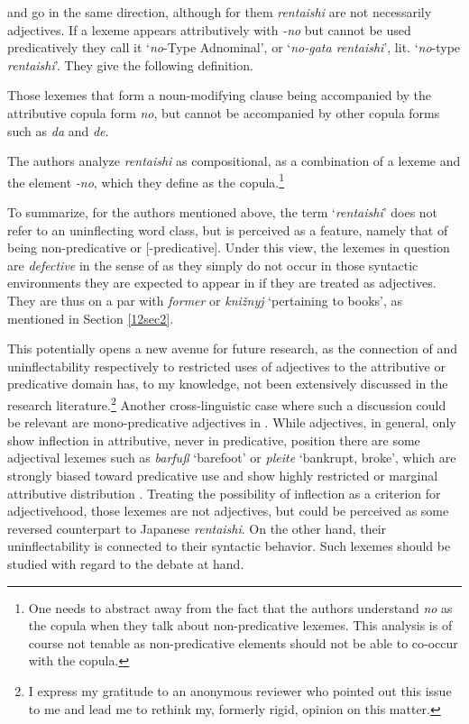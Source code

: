 \documentclass[output=paper,colorlinks,citecolor=brown]{langscibook}
\begin{document}
\largerpage[0.5]

\citet{oshimaakitasano2019} and \citet{oshimahayashi2021-nihongo, oshimahayashi2021-redefining} go in the same direction, although for them \emph{rentaishi} are not necessarily adjectives. If a lexeme appears attributively with \emph{-no} but cannot be used predicatively they call it `\emph{no}-Type Adnominal', or `\emph{no-gata rentaishi}', lit. `\emph{no}-type \emph{rentaishi}'. They give the following definition.

\begin{exe}
	\ex \label{12ex42}
	Those lexemes that form a noun-modifying clause being accompanied by the attributive copula form \emph{no}, but cannot be accompanied by other copula forms such as \emph{da} and \emph{de}. 
	
	\hfill \citep[520]{oshimahayashi2021-redefining}
\end{exe}

The authors analyze \emph{rentaishi} as compositional, as a combination of a lexeme and the element \emph{-no}, which they define as the copula.\footnote{One needs to abstract away from the fact that the authors understand \emph{no} as the copula when they talk about non-predicative lexemes. This analysis is of course not tenable as non-predicative elements should not be able to co-occur with the copula.}

To summarize, for the authors mentioned above, the term `\emph{rentaishi}' does not refer to an uninflecting word class, but is perceived as a feature, namely that of being non-predicative or [-predicative]. Under this view, the lexemes in question are \emph{defective} in the sense of \citet{spencer2020} as they simply do not occur in those syntactic environments they are expected to appear in if they are treated as adjectives. They are thus on a par with  \emph{former} or  \emph{kni\v{z}nyj} `pertaining to books', as mentioned in Section \ref{12sec2}.

This potentially opens a new avenue for future research, as the connection of  and uninflectability respectively to restricted uses of adjectives to the attributive or predicative domain has, to my knowledge, not been extensively discussed in the research literature.\footnote{I express my gratitude to an anonymous reviewer who pointed out this issue to me and lead me to rethink my, formerly rigid, opinion on this matter.} Another cross-linguistic case where such a discussion could be relevant are mono-predicative adjectives in . While  adjectives, in general, only show inflection in attributive, never in predicative, position there are some adjectival lexemes such as \textit{barfuß} ‘barefoot’ or \textit{pleite} ‘bankrupt, broke’, which are strongly biased toward predicative use and show highly restricted or marginal attributive distribution \citep{trost2006}. Treating the possibility of inflection as a criterion for adjectivehood, those lexemes are not adjectives, but could be perceived as some reversed counterpart to Japanese \emph{rentaishi}. On the other hand, their uninflectability is connected to their syntactic behavior. Such lexemes should be studied with regard to the debate at hand.
\end{document}
